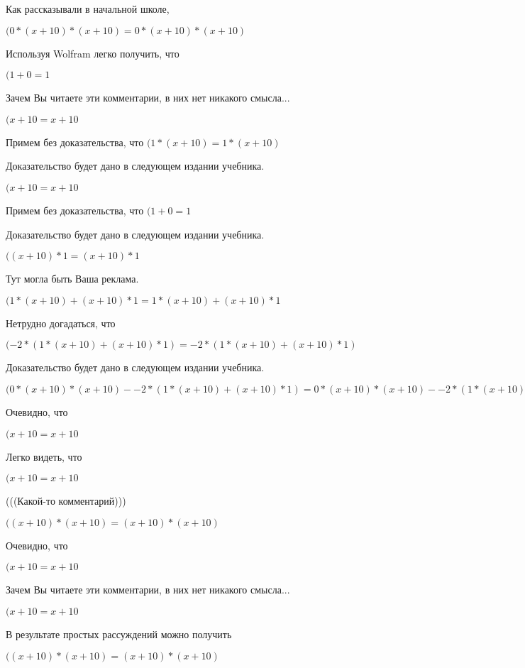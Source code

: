 \documentclass[12pt,a4paper,fleqn]{article}
\theoremstyle{definition}
\begin{document}
Как рассказывали в начальной школе,

$( 0  * ( x  +  10 ) * ( x  +  10 ) =  0  * ( x  +  10 ) * ( x  +  10 )$

Используя Wolfram легко получить, что

$( 1  +  0  =  1 $

Зачем Вы читаете эти комментарии, в них нет никакого смысла...

$( x  +  10  =  x  +  10 $

Примем без доказательства, что
$( 1  * ( x  +  10 ) =  1  * ( x  +  10 )$

Доказательство будет дано в следующем издании учебника.

$( x  +  10  =  x  +  10 $

Примем без доказательства, что
$( 1  +  0  =  1 $

Доказательство будет дано в следующем издании учебника.

$(( x  +  10 ) *  1  = ( x  +  10 ) *  1 $

Тут могла быть Ваша реклама.

$( 1  * ( x  +  10 ) + ( x  +  10 ) *  1  =  1  * ( x  +  10 ) + ( x  +  10 ) *  1 $

Нетрудно догадаться, что

$( -2  * ( 1  * ( x  +  10 ) + ( x  +  10 ) *  1 ) =  -2  * ( 1  * ( x  +  10 ) + ( x  +  10 ) *  1 )$

Доказательство будет дано в следующем издании учебника.

$( 0  * ( x  +  10 ) * ( x  +  10 ) -  -2  * ( 1  * ( x  +  10 ) + ( x  +  10 ) *  1 ) =  0  * ( x  +  10 ) * ( x  +  10 ) -  -2  * ( 1  * ( x  +  10 ) + ( x  +  10 ) *  1 )$

Очевидно, что

$( x  +  10  =  x  +  10 $

Легко видеть, что

$( x  +  10  =  x  +  10 $

(((Какой-то комментарий)))

$(( x  +  10 ) * ( x  +  10 ) = ( x  +  10 ) * ( x  +  10 )$

Очевидно, что

$( x  +  10  =  x  +  10 $

Зачем Вы читаете эти комментарии, в них нет никакого смысла...

$( x  +  10  =  x  +  10 $

В результате простых рассуждений можно получить

$(( x  +  10 ) * ( x  +  10 ) = ( x  +  10 ) * ( x  +  10 )$
\end{document}
